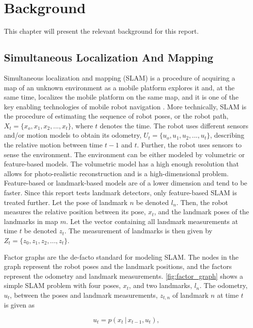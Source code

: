 \chapter{Background}

This chapter will present the relevant background for this report. 

\section{Simultaneous Localization And Mapping}

Simultaneous localization and mapping (SLAM) is a procedure of acquiring a map of an unknown environment as a mobile platform explores it and, at the same time, localizes the mobile platform on the same map, and it is one of the key enabling technologies of mobile robot navigation \cite{Stachniss2016SimultaneousMapping}. More technically, SLAM is the procedure of estimating the sequence of robot poses, or the robot path, $X_t = \{x_o, x_1, x_2,...,x_t\}$, where $t$ denotes the time. The robot uses different sensors and/or motion models to obtain its odometry, $U_t = \{u_o, u_1, u_2,...,u_t\}$, describing the relative motion between time $t-1$ and $t$. Further, the robot uses sensors to sense the environment. The environment can be either modeled by volumetric or feature-based models. The volumetric model has a high enough resolution that allows for photo-realistic reconstruction and is a high-dimensional problem. Feature-based or landmark-based models are of a lower dimension and tend to be faster. Since this report tests landmark detectors, only feature-based SLAM is treated further. Let the pose of landmark $n$ be denoted $l_n$. Then, the robot measures the relative position between its pose, $x_t$, and the landmark poses of the landmarks in map $m$. Let the vector containing all landmark measurements at time $t$ be denoted $z_t$. The measurement of landmarks is then given by $Z_t = \{z_0, z_1, z_2,...,z_t\}$.

Factor graphs are the de-facto standard for modeling SLAM. The nodes in the graph represent the robot poses and the landmark positions, and the factors represent the odometry and landmark measurements. \cref{fig:factor_graph} shows a simple SLAM problem with four poses, $x_t$, and two landmarks, $l_n$. The odometry, $u_t$, between the poses and landmark measurements, $z_{t,n}$ of landmark $n$ at time $t$ is given as

\begin{equation}
    u_t = p(x_t \,|\, x_{t-1},u_t),
    \label{eq:odom_pdf}
\end{equation}

